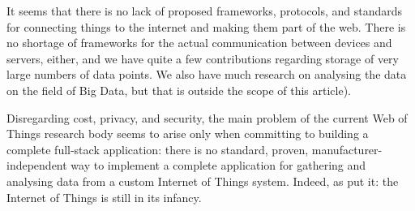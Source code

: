 It seems that there is no lack of proposed frameworks, protocols, and standards for connecting things to the internet and making them part of the web. There is no shortage of frameworks for the actual communication between devices and servers, either, and we have quite a few contributions regarding storage of very large numbers of data points. We also have much research on analysing the data on the field of Big Data, but that is outside the scope of this article).

Disregarding cost, privacy, and security, the main problem of the current Web of Things research body seems to arise only when committing to building a complete full-stack application: there is no standard, proven, manufacturer-independent way to implement a complete application for gathering and analysing data from a custom Internet of Things system. Indeed, as \textcite{xu-he-li:internet-of-things-in-industries-a-survey:2014} put it: the Internet of Things is still in its infancy.
